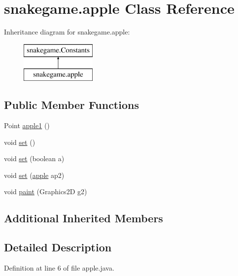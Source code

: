 \hypertarget{classsnakegame_1_1apple}{}\section{snakegame.\+apple Class Reference}
\label{classsnakegame_1_1apple}
Inheritance diagram for snakegame.\+apple\+:\begin{figure}[H]
\begin{center}
\leavevmode
\includegraphics[height=2.000000cm]{classsnakegame_1_1apple}
\end{center}
\end{figure}
\subsection*{Public Member Functions}
\begin{DoxyCompactItemize}
\item 
Point \mbox{\hyperlink{classsnakegame_1_1apple_a2a93c78385af6c64271ce163dd883712}{apple1}} ()
\item 
void \mbox{\hyperlink{classsnakegame_1_1apple_af5cab740833aef8650ef374868585930}{set}} ()
\item 
void \mbox{\hyperlink{classsnakegame_1_1apple_a4868669a889a955b0811141726005a23}{set}} (boolean a)
\item 
void \mbox{\hyperlink{classsnakegame_1_1apple_aa14da591e5ca8e5ce41da4ace3dfd8af}{set}} (\mbox{\hyperlink{classsnakegame_1_1apple}{apple}} ap2)
\item 
void \mbox{\hyperlink{classsnakegame_1_1apple_a3a6294f277af9a64dea186eb41583b97}{paint}} (Graphics2D g2)
\end{DoxyCompactItemize}
\subsection*{Additional Inherited Members}


\subsection{Detailed Description}


Definition at line 6 of file apple.\+java.



